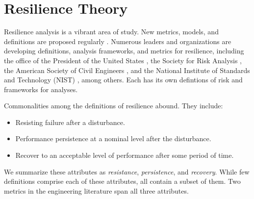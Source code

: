 \section{Resilience Theory}
Resilience analysis is a vibrant area of study. New metrics, models,
and definitions are proposed regularly \cite{Righi2015}
\cite{Hosseini2016}. Numerous leaders and organizations are developing
definitions, analysis frameworks, and metrics for resilience,
including the office of the President of the United States
\cite{PPD21}, the Society for Risk Analysis \cite{Aven2015b}, the
American Society of Civil Engineers \cite{IRD2016}, and the National
Institute of Standards and Technology (NIST) \cite{CRP2016}, among
others. Each has its own defintions of risk and frameworks for
analyses.

Commonalities among the definitions of resilience abound. They
include:
\begin{itemize}
  \item Resisting failure after a disturbance.
  \item Performance persistence at a nominal level after the
    disturbance.
  \item Recover to an acceptable level of performance after some
    period of time.
\end{itemize}
We summarize these attributes as \emph{resistance},
\emph{persistence}, and \emph{recovery}. While few definitions
comprise each of these attributes, all contain a subset of them. Two
metrics \cite{Ayyub2014a} \cite{Ayyub2015} \cite{Ouyang2012}
\cite{Ouyang2015} in the engineering literature span all three
attributes. 
